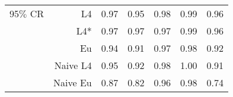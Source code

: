 \documentclass[a4paper,12pt,twoside]{book}
\begin{document}
\begin{table}[H]
\begin{tabular}{crrrrrr}
 {\color{blue} 95$\%$ CR }& L4  &0.97 & 0.95 & 0.98 & 0.99 & 0.96 \\ 
  
  &L4*  &0.97 & 0.97 & 0.97 & 0.99 & 0.96 \\ 
 
   
&Eu &  0.94 & 0.91 & 0.97 & 0.98 & 0.92 \\ 
 

  
&Naive L4&    
 0.95 & 0.92 & 0.98 & 1.00 & 0.91 \\ 
&Naive Eu &   0.87 & 0.82 & 0.96 & 0.98 & 0.74 \\ 
  
\end{tabular}

\end{table}
\end{document}
